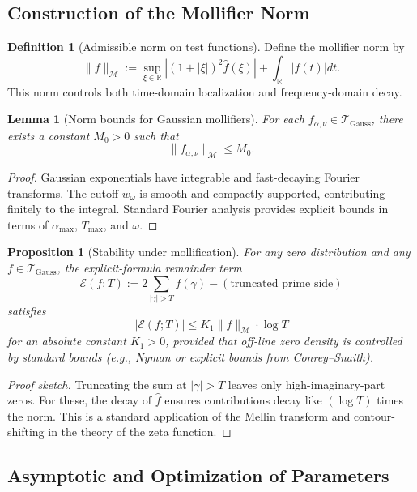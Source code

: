 \documentclass[11pt]{article}
\theoremstyle{plain}
\newtheorem{proposition}[theorem]{Proposition}
\newtheorem{lemma}[theorem]{Lemma}
\theoremstyle{definition}
\newtheorem{definition}[theorem]{Definition}
\theoremstyle{remark}
\begin{document}
\subsection{Construction of the Mollifier Norm}

\begin{definition}[Admissible norm on test functions]
Define the mollifier norm by
\[
\|f\|_{\mathcal{M}} := \sup_{\xi\in\mathbb{R}} \left|(1+|\xi|)^2 \widehat{f}(\xi)\right| + \int_{\mathbb{R}} |f(t)| dt.
\]
This norm controls both time-domain localization and frequency-domain decay.
\end{definition}

\begin{lemma}[Norm bounds for Gaussian mollifiers]
For each $f_{\alpha,\nu}\in\mathcal{T}_{\mathrm{Gauss}}$, there exists a constant $M_0>0$ such that
\[
\|f_{\alpha,\nu}\|_{\mathcal{M}} \le M_0.
\]
\end{lemma}

\begin{proof}
Gaussian exponentials have integrable and fast-decaying Fourier transforms.
The cutoff $w_\omega$ is smooth and compactly supported, contributing finitely to the integral.
Standard Fourier analysis provides explicit bounds in terms of $\alpha_{\max}$, $T_{\max}$, and $\omega$.
\end{proof}

\begin{proposition}[Stability under mollification]
For any zero distribution and any $f\in\mathcal{T}_{\mathrm{Gauss}}$, the explicit-formula remainder term
\[
\mathcal{E}(f;T) := 2\sum_{|\gamma|>T} f(\gamma) - (\text{truncated prime side})
\]
satisfies
\[
|\mathcal{E}(f;T)| \le K_1 \|f\|_{\mathcal{M}} \cdot \log T
\]
for an absolute constant $K_1>0$, provided that off-line zero density is controlled by standard bounds
(e.g., Nyman or explicit bounds from Conrey--Snaith).
\end{proposition}

\begin{proof}[Proof sketch]
Truncating the sum at $|\gamma|>T$ leaves only high-imaginary-part zeros.
For these, the decay of $\widehat{f}$ ensures contributions decay like $(\log T)$ times the norm.
This is a standard application of the Mellin transform and contour-shifting in the theory of the zeta function.
\end{proof}

\subsection{Asymptotic and Optimization of Parameters}
\end{document}
